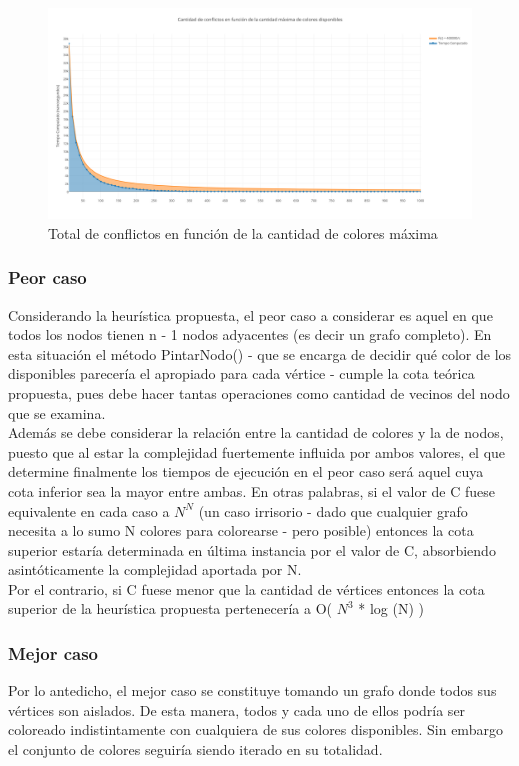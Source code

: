  \begin{figure}[H]
    \begin{center}
  	\includegraphics[width=18cm]{imagenes/ej3/coloresconflicto.png}
 	\caption{Total de conflictos en función de la cantidad de colores máxima}
 	\label{coloresconflicto}
    \end{center}
  \end{figure}

\subsubsection{Peor caso}
Considerando la heurística propuesta, el peor caso a considerar es aquel en que todos los nodos tienen n - 1 nodos adyacentes (es decir un grafo completo). En esta situación el método PintarNodo() - que  se encarga de decidir qué color de los disponibles parecería el apropiado para cada vértice - cumple la cota teórica propuesta, pues debe hacer tantas operaciones como cantidad de vecinos del nodo que  se examina.\\

Además se debe considerar la relación entre la cantidad de colores y la de nodos, puesto que al estar la complejidad fuertemente influida por ambos valores, el que determine finalmente los tiempos de ejecución en el peor caso será aquel cuya cota inferior sea la mayor entre ambas. En otras palabras, si el valor de C fuese equivalente en cada caso a $N^{N}$  (un caso irrisorio - dado que cualquier grafo necesita a lo sumo N colores para colorearse - pero posible) entonces la cota superior estaría determinada en última instancia por el valor de C, absorbiendo asintóticamente la complejidad aportada por N. \\
Por el contrario, si C fuese menor que la cantidad de vértices entonces la cota superior de la heurística propuesta pertenecería a O( $N^{3}$ * log (N) )


\subsubsection{Mejor caso}
Por lo antedicho, el mejor caso se constituye tomando un grafo donde todos sus vértices son aislados. De esta manera, todos y cada uno de ellos podría ser coloreado indistintamente con cualquiera de sus colores disponibles. Sin embargo el conjunto de colores seguiría siendo iterado en su totalidad.



\newpage
